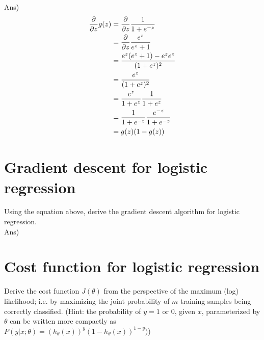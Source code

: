 \documentclass[12pt]{article}%
\begin{document}
Ans) 
\begin{equation}
	\begin{aligned}
		{\partial \over {\partial z}} g(z) & = {\partial \over {\partial z}} {1 \over {1 + e^{-z}}}\\
		& = {\partial \over {\partial z}} {e^z \over {e^z + 1}} \\
		& = {{e^z (e^z + 1) - e^z e^z} \over {(1 +e^z )^2}} \\
		& = {e^z \over {(1 +e^z )^2}} \\
		& = {e^z \over {1 +e^z }} {1 \over {1 +e^z }} \\
		& = {1 \over {1 +e^{-z} }} {e^{-z} \over {1 +e^{-z} }} \\
		& = g(z) (1 - g(z))
	\end{aligned}
\end{equation}

\section{Gradient descent for logistic regression}
Using the equation above, derive the gradient descent algorithm for logistic regression.\\

Ans)


\section{Cost function for logistic regression}
Derive the cost function $J(\theta)$ from the perspective of the maximum (log) likelihood; i.e. by maximizing the joint probability of $m$ training samples being correctly classified. (Hint: the probability of $y=1$ or $0$, given $x$, parameterized by $\theta$ can be written more compactly as $P(y | x; \theta) = (h_\theta (x))^y (1 - h_\theta (x))^{1-y} )$)\\
\end{document}
